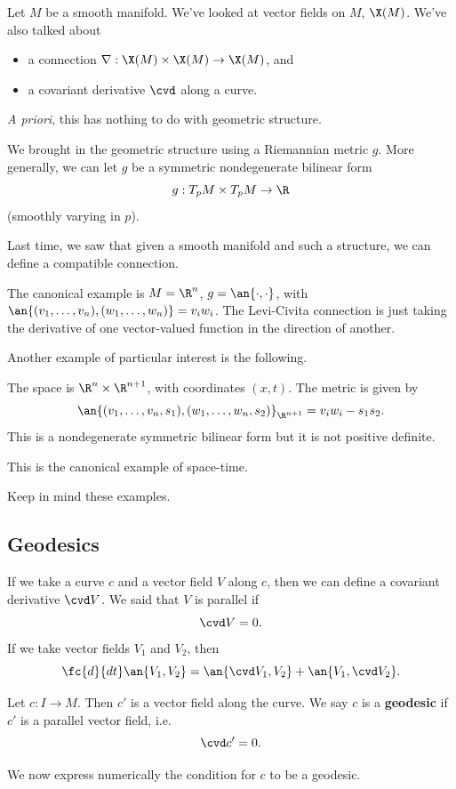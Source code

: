 
Let $M$ be a smooth manifold. %
We've looked at vector fields on $M$, $\X(M)$. We've also talked about
\begin{itemize}
\item
a connection $\nabla:\X(M)\times \X(M)\to \X(M)$, and
\item
a covariant derivative $\cvd$ along a curve.
\end{itemize}
{\it A priori}, this has nothing to do with geometric structure. 

We brought in the geometric structure using a Riemannian metric $g$. More generally, we can let $g$ be a symmetric nondegenerate bilinear form
\[
g:T_pM\times T_pM\to \R
\]
(smoothly varying in $p$).

Last time, we saw that given a smooth manifold and such a structure, we can define a compatible connection. 

The canonical example is $M=\R^n$, $g=\an{\cdot,\cdot}$, with $\an{(v_1,\ldots, v_n),(w_1,\ldots, w_n)}=v_iw_i$. The Levi-Civita connection is just taking the derivative of one vector-valued function in the direction of another.

Another example of particular interest is the following.
\begin{ex}
The space is $\R^n\times \R^{n+1}$, with coordinates $(x,t)$. The metric is given by
\[
\an{(v_1,\ldots, v_n,s_1),(w_1,\ldots, w_n,s_2)}_{\R^{n+1}}
=v_iw_i-s_1s_2.
\]
This is a nondegenerate symmetric bilinear form but it is not positive definite.

This is the canonical example of space-time.
\end{ex}
Keep in mind these examples.
\subsection{Geodesics}
If we take a curve $c$ and a vector field $V$ along $c$, then we can define a covariant derivative $\cvd V$. We said that $V$ is parallel if
\[
\cvd V=0.
\]
If we take vector fields $V_1$ and $V_2$, then
\[
\fc{d}{dt}\an{V_1,V_2}=\an{\cvd V_1,V_2}+\an{V_1,\cvd V_2}.
\]
\begin{df}
Let $c:I\to M$. Then $c'$ is a vector field along the curve. We say $c$ is a \textbf{geodesic} if $c'$ is a parallel vector field, i.e.
\[
\cvd c'=0.
\]
\end{df}
We now express numerically the condition for $c$ to be a geodesic.

